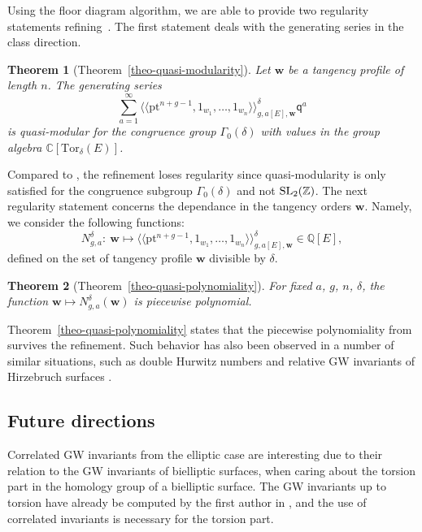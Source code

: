 \documentclass[pdftex]{sigma}
\newcommand{\Tor}{\mathrm{Tor}}
\newcommand{\pt}{\mathrm{pt}}
\newcommand{\ZZ}{\mathbb{Z}}
\newcommand{\CC}{\mathbb{C}}
\newcommand{\QQ}{\mathbb{Q}}
\newcommand{\bfw}{ {\boldsymbol w} }
\newcommand{\sfq}{\mathsf{q}}
\newcommand{\gen}[1]{\big\langle #1 \big\rangle}
\numberwithin{equation}{section}
\newtheorem*{theom}{Theorem}
\theoremstyle{definition}
\begin{document}
Using the floor diagram algorithm, we are able to provide two regularity statements refining~\cite[Theorems 6.6 and 6.9]{blomme2022floor}. The first statement deals with the generating series in the class direction.

\begin{theom}[Theorem~\ref{theo-quasi-modularity}]
 Let $\bfw$ be a tangency profile of length $n$. The generating series
 \[ \sum_{a=1}^\infty \gen{\gen{\pt^{n+g-1},1_{w_1},\dots,1_{w_n}}}_{g,a[E],\bfw}^\delta \sfq^a \]
 is quasi-modular for the congruence group $\Gamma_0(\delta)$ with values in the group algebra $\CC[\Tor_\delta(E)]$.
\end{theom}

Compared to \cite[Theorem~6.9]{blomme2022floor}, the refinement loses regularity since quasi-modularity is only satisfied for the congruence subgroup $\Gamma_0(\delta)$ and not ${\rm SL}_2(\ZZ)$. The next regularity statement concerns the dependance in the tangency orders $\bfw$. Namely, we consider the following functions:
\[ N^\delta_{g,a}\colon\ \bfw\longmapsto \bigl\langle\bigl\langle \pt^{n+g-1},1_{w_1},\dots,1_{w_n} \bigl\rangle\bigr\rangle^\delta_{g,a[E],\bfw} \in\QQ[E], \]
defined on the set of tangency profile $\bfw$ divisible by $\delta$.

\begin{theom}[Theorem~\ref{theo-quasi-polynomiality}]
 For fixed $a$, $g$, $n$, $\delta$, the function $\bfw\mapsto N^\delta_{g,a}(\bfw)$ is piecewise polynomial.
\end{theom}

Theorem~\ref{theo-quasi-polynomiality} states that the piecewise polynomiality from \cite[Theorem 6.6]{blomme2022floor} survives the refinement. Such behavior has also been observed in a number of similar situations, such as double Hurwitz numbers and relative GW invariants of Hirzebruch surfaces \cite{ardila2017double}.

\subsection{Future directions}
Correlated GW invariants from the elliptic case are interesting due to their relation to the GW invariants of bielliptic surfaces, when caring about the torsion part in the homology group of a bielliptic surface. The GW invariants up to torsion have already be computed by the first author in \cite{blomme2024bielliptic}, and the use of correlated invariants is necessary for the torsion part.
\end{document}
